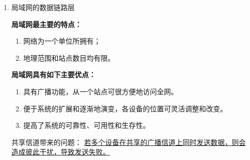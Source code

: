 \documentclass[11pt]{article}
\begin{document}
\begin{enumerate}
\begin{enumerate}
\item PPP协议的工作状态
\label{sec:orgc1935af}

PPP 链路初始化过程：
\begin{itemize}
\item 用户拨号接入 ISP 后，就建立了一条从用户个人电脑到 ISP 的物理连接。
\item 用户个人电脑向 ISP 发送一系列的链路控制协议 LCP 分组（封装成多个 PPP 帧），以便建立LCP连接。
\item 之后进行网络层配置。网络控制协议 NCP 给新接入的用户个人电脑分配一个临时的 IP 地址。
\item 当用户通信完毕时，NCP 释放网络层连接，收回原来分配出去的IP地址。LCP 释放数据链路层连接。最后释放的是物理层的连接。
\end{itemize}
\end{enumerate}
\item 局域网的数据链路层
\label{sec:orgb3142f9}

\textbf{局域网最主要的特点：}
\begin{enumerate}
\item 网络为一个单位所拥有；
\item 地理范围和站点数目均有限。
\end{enumerate}
\textbf{局域网具有如下主要优点：}
\begin{enumerate}
\item 具有广播功能，从一个站点可很方便地访问全网。
\item 便于系统的扩展和逐渐地演变，各设备的位置可灵活调整和改变。
\item 提高了系统的可靠性、可用性和生存性。
\end{enumerate}

共享信道带来的问题：
\uline{若多个设备在共享的广播信道上同时发送数据，则会造成彼此干扰，导致发送失败。}


\end{enumerate}
\end{document}
